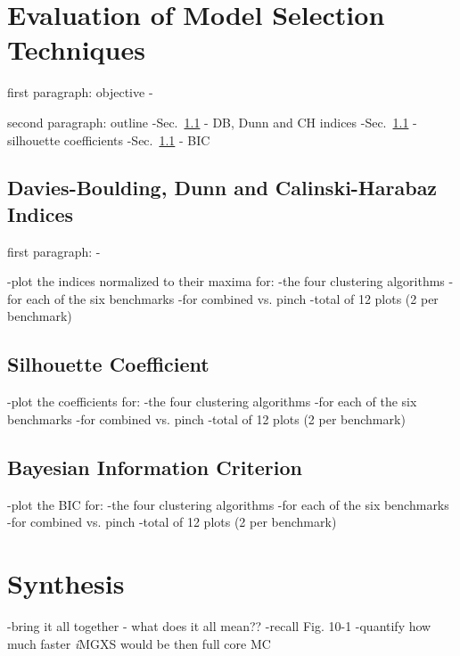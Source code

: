 \clearpage


\section{Evaluation of Model Selection Techniques}
\label{sec:chap11-model-select}

first paragraph: objective
-

second paragraph: outline
-Sec.~\ref{subsec:chap11-db-dunn-ch-indices} - DB, Dunn and CH indices
-Sec.~\ref{subsec:chap11-db-dunn-ch-indices} - silhouette coefficients
-Sec.~\ref{subsec:chap11-db-dunn-ch-indices} - BIC


\subsection{Davies-Boulding, Dunn and Calinski-Harabaz Indices}
\label{subsec:chap11-db-dunn-ch-indices}

first paragraph:
-

-plot the indices normalized to their maxima for:
  -the four clustering algorithms
  -for each of the six benchmarks
  -for combined vs. pinch
  -total of 12 plots (2 per benchmark)

\subsection{Silhouette Coefficient}
\label{subsec:chap11-silhouette-coeff}

-plot the coefficients for:
  -the four clustering algorithms
  -for each of the six benchmarks
  -for combined vs. pinch
  -total of 12 plots (2 per benchmark)

\subsection{Bayesian Information Criterion}
\label{subsec:chap11-bic}

-plot the BIC for:
  -the four clustering algorithms
  -for each of the six benchmarks
  -for combined vs. pinch
  -total of 12 plots (2 per benchmark)

\section{Synthesis}
\label{sec:chap11-synthesis}

-bring it all together - what does it all mean??
-recall Fig. 10-1
  -quantify how much faster \textit{i}\ac{MGXS} would be then full core MC
